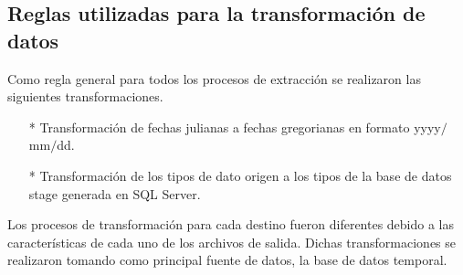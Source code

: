 \documentclass[a4paper,openright,12pt]{book}
\begin{document}
\subsection{Reglas utilizadas para la transformación de datos}
Como regla general para todos los procesos de extracción se realizaron las siguientes transformaciones. 
\begin{itemize}
\item[*] Transformación de fechas julianas a fechas gregorianas en formato yyyy$/$mm$/$dd.
\item[*] Transformación de los tipos de dato origen a los tipos de la base de datos stage generada en SQL Server.
\end{itemize}

Los procesos de transformación para cada destino fueron diferentes debido a las características de cada uno de los archivos de salida. Dichas transformaciones se realizaron tomando como principal fuente de datos, la base de datos temporal. 
\end{document}
